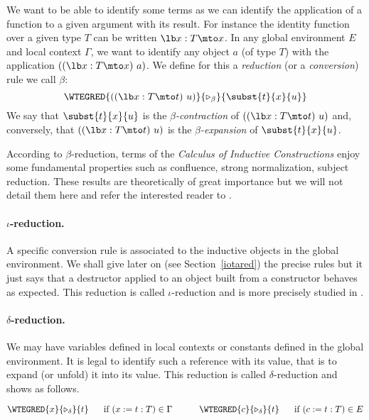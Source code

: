 We want to be able to identify some terms as we can identify the
application of a function to a given argument with its result. For
instance the identity function over a given type $T$ can be written
$\lb x:T\mto x$. In any global environment $E$ and local context $\Gamma$, we want to identify any object $a$ (of type $T$) with the
application $((\lb x:T\mto x)~a)$. We define for this a {\em reduction} (or a
{\em conversion}) rule we call $\beta$:
\[ \WTEGRED{((\lb x:T\mto
  t)~u)}{\triangleright_{\beta}}{\subst{t}{x}{u}} \] 
We say that $\subst{t}{x}{u}$ is the {\em $\beta$-contraction} of
$((\lb x:T\mto t)~u)$ and, conversely, that $((\lb x:T\mto t)~u)$
is the {\em $\beta$-expansion} of $\subst{t}{x}{u}$.

According to $\beta$-reduction, terms of the {\em Calculus of
  Inductive Constructions} enjoy some fundamental properties such as
confluence, strong normalization, subject reduction. These results are
theoretically of great importance but we will not detail them here and
refer the interested reader to \cite{Coq85}.

\paragraph[$\iota$-reduction.]{$\iota$-reduction.\label{iota}}
A specific conversion rule is associated to the inductive objects in
the global environment.  We shall give later on (see Section~\ref{iotared}) the
precise rules but it just says that a destructor applied to an object
built from a constructor behaves as expected.  This reduction is
called $\iota$-reduction and is more precisely studied in
\cite{Moh93,Wer94}.


\paragraph[$\delta$-reduction.]{$\delta$-reduction.\label{delta}}

We may have variables defined in local contexts or constants defined in the global
environment. It is legal to identify such a reference with its value,
that is to expand (or unfold) it into its value. This
reduction is called $\delta$-reduction and shows as follows.

$$\WTEGRED{x}{\triangleright_{\delta}}{t}~~~~~\mbox{if $(x:=t:T) \in \Gamma$}~~~~~~~~~\WTEGRED{c}{\triangleright_{\delta}}{t}~~~~~\mbox{if $(c:=t:T) \in E$}$$


